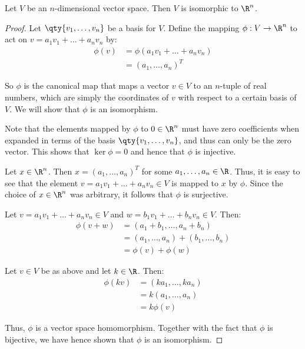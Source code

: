 \begin{theorem}
  \label{thm:iso}
  Let \( V \) be an \( n \)-dimensional vector space. Then \( V \) is isomorphic to \( \R^n \).
\end{theorem}
\begin{proof}
  Let \( \qty{v_1,\dots,v_n} \) be a basis for \( V \). Define the mapping \( \phi:V\to\R^n \) to act on \( v=a_1v_1+\dots+a_nv_n \) by:
  \begin{align*}
    \phi(v)&=\phi(a_1v_1+\dots+a_nv_n)\\
    &= (a_1,\dots,a_n)^T
  \end{align*}

  So \( \phi \) is the canonical map that maps a vector \( v\in V \) to an \( n \)-tuple of real numbers, which are simply the coordinates of \( v \) with respect to a certain basis of \( V \). We will show that \( \phi \) is an isomorphism.

  \vspace{3mm}

  Note that the elements mapped by \( \phi \) to \( 0\in\R^n \) must have zero coefficients when expanded in terms of the basis \( \qty{v_1,\dots, v_n} \), and thus can only be the zero vector. This shows that \( \ker\phi=\qty{0} \) and hence that \( \phi \) is injective.

  \vspace{3mm}

  Let \( x\in\R^n \). Then \( x=(a_1,\dots,a_n)^T \) for some \( a_1,\dots,a_n\in\R \). Thus, it is easy to see that the element \( v=a_1v_1+\dots+a_nv_n\in V \) is mapped to \( x \) by \( \phi \). Since the choice of \( x\in\R^n \) was arbitrary, it follows that \( \phi \) is surjective.

  \vspace{3mm}

  Let \( v=a_1v_1+\dots+a_nv_n\in V \) and \( w=b_1v_1+\dots+b_nv_n\in V \). Then:
  \begin{align*}
    \phi(v+w)&= (a_1+b_1,\dots,a_n+b_n)\\
    &= (a_1,\dots,a_n)+(b_1,\dots,b_n)\\
    &= \phi(v)+\phi(w)
  \end{align*}

  Let \( v\in V \) be as above and let \( k\in\R \). Then:
  \begin{align*}
    \phi(kv)&= (ka_1,\dots,ka_n)\\
    &= k(a_1,\dots,a_n)\\
    &= k\phi(v)
  \end{align*}

  Thus, \( \phi \) is a vector space homomorphism. Together with the fact that \( \phi \) is bijective, we have hence shown that \( \phi \) is an isomorphism.
\end{proof}

